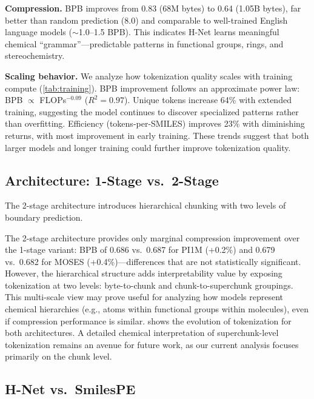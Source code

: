 \documentclass{article}
\newcommand{\hnet}{H-Net}
\newcommand{\bpb}{BPB}
\begin{document}
\textbf{Compression.} \bpb{} improves from 0.83 (68M bytes) to 0.64 (1.05B bytes), far better than random prediction (8.0) and comparable to well-trained English language models ($\sim$1.0--1.5 \bpb{}). This indicates \hnet{} learns meaningful chemical ``grammar''---predictable patterns in functional groups, rings, and stereochemistry.


\textbf{Scaling behavior.} We analyze how tokenization quality scales with training compute (\cref{tab:training}). \bpb{} improvement follows an approximate power law: \bpb{} $\propto$ FLOPs$^{-0.09}$ ($R^2 = 0.97$). Unique tokens increase 64\% with extended training, suggesting the model continues to discover specialized patterns rather than overfitting. Efficiency (tokens-per-SMILES) improves 23\% with diminishing returns, with most improvement in early training. These trends suggest that both larger models and longer training could further improve tokenization quality.

\subsection{Architecture: 1-Stage vs.\ 2-Stage}

The 2-stage architecture introduces hierarchical chunking with two levels of boundary prediction.

The 2-stage architecture provides only marginal compression improvement over the 1-stage variant: \bpb{} of 0.686 vs.\ 0.687 for PI1M (+0.2\%) and 0.679 vs.\ 0.682 for MOSES (+0.4\%)---differences that are not statistically significant. However, the hierarchical structure adds interpretability value by exposing tokenization at two levels: byte-to-chunk and chunk-to-superchunk groupings. This multi-scale view may prove useful for analyzing how models represent chemical hierarchies (e.g., atoms within functional groups within molecules), even if compression performance is similar.  shows the evolution of tokenization for both architectures. A detailed chemical interpretation of superchunk-level tokenization remains an avenue for future work, as our current analysis focuses primarily on the chunk level.

\subsection{H-Net vs.\ SmilesPE}
\end{document}
